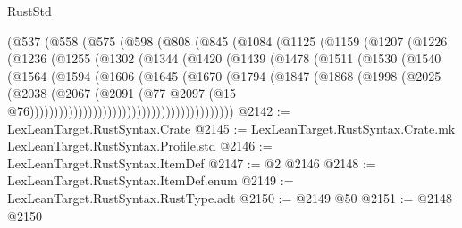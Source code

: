 \begin{lexlean}{RustStd}
\begin{coremodule}
                (@537
                  (@558
                    (@575
                      (@598
                        (@808
                          (@845
                            (@1084
                              (@1125
                                (@1159
                                  (@1207
                                    (@1226
                                      (@1236
                                        (@1255
                                          (@1302
                                            (@1344
                                              (@1420
                                                (@1439
                                                  (@1478
                                                    (@1511
                                                      (@1530
                                                        (@1540
                                                          (@1564
                                                            (@1594
                                                              (@1606
                                                                (@1645
                                                                  (@1670
                                                                    (@1794
                                                                      (@1847
                                                                        (@1868
                                                                          (@1998
                                                                            (@2025
                                                                              (@2038
                                                                                (@2067
                                                                                  (@2091
                                                                                    (@77
                                                                                      @2097
                                                                                      (@15
                                                                                        @76))))))))))))))))))))))))))))))))))))))))))
@2142 := LexLeanTarget.RustSyntax.Crate
@2145 := LexLeanTarget.RustSyntax.Crate.mk LexLeanTarget.RustSyntax.Profile.std
@2146 := LexLeanTarget.RustSyntax.ItemDef
@2147 := @2 @2146
@2148 := LexLeanTarget.RustSyntax.ItemDef.enum
@2149 := LexLeanTarget.RustSyntax.RustType.adt
@2150 := @2149 @50
@2151 := @2148 @2150

\end{coremodule}
\end{lexlean}
